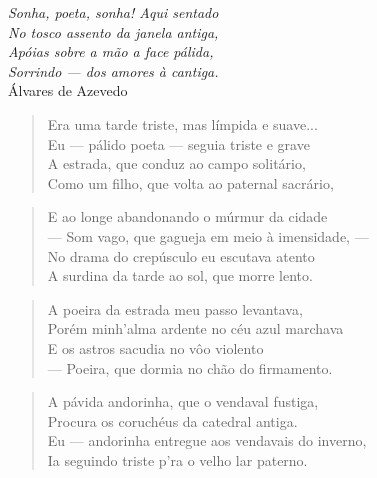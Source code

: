 \begin{anexosenv}
\settowidth{\versewidth}{}

\begin{flushright}
\textit{Sonha, poeta, sonha! Aqui sentado \\
No tosco assento da janela antiga,\\
Apóias sobre a mão a face pálida,\\
Sorrindo — dos amores à cantiga.}\\
Álvares de Azevedo
\end{flushright}

\begin{verse}
Era uma tarde triste, mas límpida e suave... \\
Eu — pálido poeta — seguia triste e grave \\
A estrada, que conduz ao campo solitário, \\
Como um filho, que volta ao paternal sacrário, \\
\end{verse}

\begin{verse}
E ao longe abandonando o múrmur da cidade \\
— Som vago, que gagueja em meio à imensidade, — \\
No drama do crepúsculo eu escutava atento \\
A surdina da tarde ao sol, que morre lento. \\
\end{verse}

\begin{verse}
A poeira da estrada meu passo levantava, \\
Porém minh'alma ardente no céu azul marchava \\
E os astros sacudia no vôo violento \\
— Poeira, que dormia no chão do firmamento. \\
\end{verse}

\begin{verse}
A pávida andorinha, que o vendaval fustiga, \\
Procura os coruchéus da catedral antiga. \\
Eu — andorinha entregue aos vendavais do inverno, \\
Ia seguindo triste p'ra o velho lar paterno. \\
\end{verse}


\end{anexosenv}
